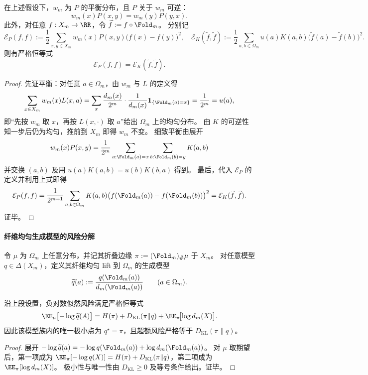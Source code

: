 \begin{proposition}[可逆平衡与能量形式保持]\label{prop:op-algebra-fold-lift-noise-fold-reversibility}
在上述假设下，\(w_m\) 为 \(P\) 的平衡分布，且 \(P\) 关于 \(w_m\) 可逆：
\[
w_m(x)P(x,y)=w_m(y)P(y,x).
\]
此外，对任意 \(f:X_m\to\RR\)，令 \(\widetilde f:=f\circ\Fold_m\)。
分别记
\[
\mathcal E_P(f,f):=\frac12\sum_{x,y\in X_m}w_m(x)P(x,y)\bigl(f(x)-f(y)\bigr)^2,
\quad
\mathcal E_K(\widetilde f,\widetilde f):=\frac12\sum_{a,b\in\Omega_m}u(a)K(a,b)\bigl(\widetilde f(a)-\widetilde f(b)\bigr)^2.
\]
则有严格恒等式
\[
\boxed{\;\mathcal E_P(f,f)=\mathcal E_K(\widetilde f,\widetilde f).\;}
\]
\end{proposition}
\begin{proof}
先证平衡：对任意 \(a\in\Omega_m\)，由 \(w_m\) 与 \(L\) 的定义得
\[
\sum_{x\in X_m} w_m(x)L(x,a)
=\sum_x \frac{d_m(x)}{2^m}\cdot \frac{1}{d_m(x)}\mathbf 1_{\{\Fold_m(a)=x\}}
=\frac{1}{2^m}=u(a),
\]
即“先按 \(w_m\) 取 \(x\)，再按 \(L(x,\cdot)\) 取 \(a\)”给出 \(\Omega_m\) 上的均匀分布。
由 \(K\) 的可逆性知一步后仍为均匀，推前到 \(X_m\) 即得 \(w_m\) 不变。
细致平衡由展开
\[
w_m(x)P(x,y)
=\frac{1}{2^m}\sum_{a:\Fold_m(a)=x}\sum_{b:\Fold_m(b)=y}K(a,b)
\]
并交换 \((a,b)\) 及用 \(u(a)K(a,b)=u(b)K(b,a)\) 得到。
最后，代入 \(\mathcal E_P\) 的定义并利用上式即得
\[
\mathcal E_P(f,f)
=\frac{1}{2^{m+1}}\sum_{a,b\in\Omega_m}K(a,b)\bigl(f(\Fold_m(a))-f(\Fold_m(b))\bigr)^2
=\mathcal E_K(\widetilde f,\widetilde f).
\]
证毕。
\end{proof}

\paragraph{纤维均匀生成模型的风险分解}
令 \(\mu\) 为 \(\Omega_m\) 上任意分布，并记其折叠边缘 \(\pi:= (\Fold_m)_\#\mu\) 于 \(X_m\)。
对任意模型 \(q\in\Delta(X_m)\)，定义其纤维均匀 lift 到 \(\Omega_m\) 的生成模型
\[
\widetilde q(a):=\frac{q(\Fold_m(a))}{d_m(\Fold_m(a))}\qquad(a\in\Omega_m).
\]

\begin{proposition}[负对数似然的严格账本分解]\label{prop:op-algebra-fold-uniformlift-nll-decomposition}
沿上段设置，负对数似然风险满足严格恒等式
\[
\EE_{\mu}\bigl[-\log \widetilde q(A)\bigr]
=H(\pi)+D_{\mathrm{KL}}(\pi\|q)+\EE_{\pi}\!\bigl[\log d_m(X)\bigr].
\]
因此该模型族内的唯一极小点为 \(q^\star=\pi\)，且超额风险严格等于 \(D_{\mathrm{KL}}(\pi\|q)\)。
\end{proposition}
\begin{proof}
展开
\(
-\log \widetilde q(a)=-\log q(\Fold_m(a))+\log d_m(\Fold_m(a))
\)。
对 \(\mu\) 取期望后，第一项成为 \(\EE_{\pi}[-\log q(X)]=H(\pi)+D_{\mathrm{KL}}(\pi\|q)\)，第二项成为 \(\EE_{\pi}[\log d_m(X)]\)。
极小性与唯一性由 \(D_{\mathrm{KL}}\ge 0\) 及等号条件给出。证毕。
\end{proof}

